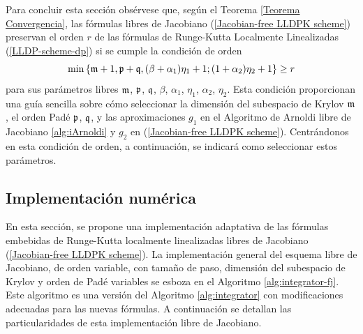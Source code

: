 Para concluir esta sección obsérvese que, según el Teorema \ref{Teorema Convergencia}, las fórmulas libres de Jacobiano (\ref{Jacobian-free LLDPK scheme})
preservan el orden $r$ de las fórmulas de Runge-Kutta Localmente Linealizadas (\ref{LLDP-scheme-dp}) si se cumple la condición de orden
\begin{equation}
\min\left\{  \mathfrak{m} + 1, \mathfrak{p}+\mathfrak{q}, (\beta+\alpha_1)\eta_1+1; (1 + \alpha_2) \eta_2 + 1 \right\}\geq r \label{fj-order-condition}
\end{equation}
para sus parámetros libres $\mathfrak{m}$, $\mathfrak{p}$, $\mathfrak{q}$, $\beta$, $\alpha_1$, $\eta_1$, $\alpha_2$, $\eta_2$. Esta condición proporcionan una guía sencilla sobre cómo
seleccionar la dimensión del subespacio de Krylov $\mathfrak{m}$, el orden Padé $\mathfrak{p}$, $\mathfrak{q}$, y las aproximaciones $g_1$ en el Algoritmo de Arnoldi libre de Jacobiano \ref{alg:iArnoldi} y $g_2$ en (\ref{Jacobian-free LLDPK scheme}). Centrándonos en esta condición de orden, a continuación, se indicará como seleccionar estos parámetros.

\subsection{Implementación numérica}\label{sec:fj-num-impl}

En esta sección, se propone una implementación adaptativa de las fórmulas embebidas de Runge-Kutta localmente linealizadas libres de Jacobiano (\ref{Jacobian-free LLDPK scheme}). La implementación general del esquema libre de Jacobiano, de orden variable, con tamaño de paso, dimensión del subespacio de Krylov y orden de Padé variables se esboza en el Algoritmo \ref{alg:integrator-fj}. Este algoritmo es una versión del Algoritmo \ref{alg:integrator} con modificaciones adecuadas para las nuevas fórmulas. A continuación se detallan las particularidades de esta implementación libre de Jacobiano.


